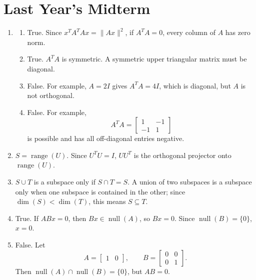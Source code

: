 \section{Last Year's Midterm}

\begin{enumerate}[label=\textbf{\arabic*.}]
    \item
    \begin{enumerate}[label=(\alph*)]
        \item True. Since \(x^TA^TAx=\|Ax\|^2\), if \(A^TA=0\), every
        column of \(A\) has zero norm.
        \item True. \(A^TA\) is symmetric. A symmetric upper triangular
        matrix must be diagonal.
        \item False. For example, \(A=2I\) gives \(A^TA=4I\), which is
        diagonal, but \(A\) is not orthogonal.
        \item False. For example,
        \[
            A^TA=
            \begin{bmatrix}
                1&-1\\
                -1&1
            \end{bmatrix}
        \]
        is possible and has all off-diagonal entries negative.
    \end{enumerate}

    \item \(S=\operatorname{range}(U)\). Since \(U^TU=I\), \(UU^T\) is
    the orthogonal projector onto \(\operatorname{range}(U)\).

    \item \(S\cup T\) is a subspace only if \(S\cap T=S\). A union of two
    subspaces is a subspace only when one subspace is contained in the
    other; since \(\dim(S)<\dim(T)\), this means \(S\subseteq T\).

    \item True. If \(ABx=0\), then \(Bx\in\operatorname{null}(A)\), so
    \(Bx=0\). Since \(\operatorname{null}(B)=\{0\}\), \(x=0\).

    \item False. Let
    \[
        A=\begin{bmatrix}1&0\end{bmatrix},
        \qquad
        B=\begin{bmatrix}0&0\\0&1\end{bmatrix}.
    \]
    Then \(\operatorname{null}(A)\cap\operatorname{null}(B)=\{0\}\), but
    \(AB=0\).


\end{enumerate}
